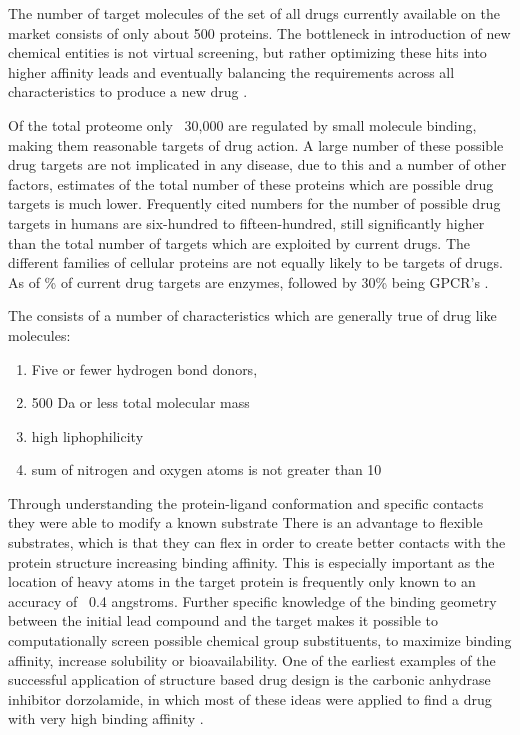 The number of target molecules of the set of all drugs currently available on the market consists of only about 500 proteins.
The bottleneck in introduction of new chemical entities is not virtual screening, but rather optimizing these hits into higher affinity leads and eventually balancing the requirements across all characteristics to produce a new drug \cite{bleicher2003hit}.

Of the total proteome only ~30,000 are regulated by small molecule binding, making them reasonable targets of drug action.
A large number of these possible drug targets are not implicated in any disease, due to this and a number of other factors, estimates of the total number of these proteins which are possible drug targets is much lower.
Frequently cited numbers for the number of possible drug targets in humans are six-hundred to fifteen-hundred, still significantly higher than the total number of targets which are exploited by current drugs.
The different families of cellular proteins are not equally likely to be targets of drugs.
As of \the{}\% of current drug targets are enzymes, followed by 30\% being GPCR's \cite{hopkins2002druggable}.

The consists of a number of characteristics which are generally true of drug like molecules:
\begin{enumerate}
\item Five or fewer hydrogen bond donors,
\item 500 Da or less total molecular mass
\item high liphophilicity
\item sum of nitrogen and oxygen atoms is not greater than 10 \cite{rule_of_five}
\end{enumerate}

Through understanding the protein-ligand conformation and specific contacts they were able to modify a known substrate 
There is an advantage to flexible substrates, which is that they can flex in order to create better contacts with the protein structure increasing binding affinity.
This is especially important as the location of heavy atoms in the target protein is frequently only known to an accuracy of ~0.4 angstroms.
Further specific knowledge of the binding geometry between the initial lead compound and the target makes it possible to computationally screen possible chemical group substituents, to maximize binding affinity, increase solubility or bioavailability.
One of the earliest examples of the successful application of structure based drug design is the carbonic anhydrase inhibitor dorzolamide, in which most of these ideas were applied to find a drug with very high binding affinity \cite{greer1994application}.

